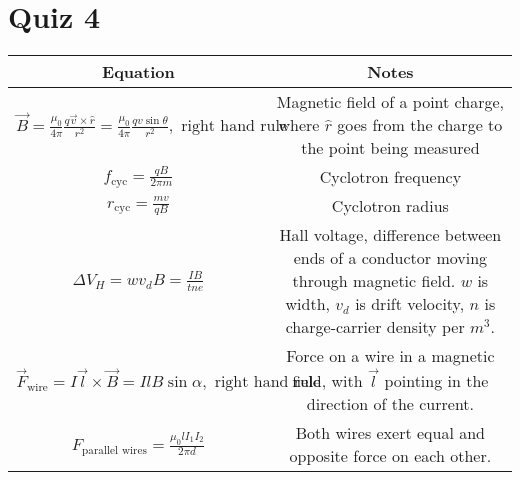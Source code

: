 \documentclass{article}
\begin{document}
\section{Quiz 4}

\begin{tabular}{|c|c|}
	\hline Equation                                             & Notes                                                    \\

	\hline $\vec B = \frac{\mu_0}{4 \pi} \frac{q \vec v \times \hat r}{r^2}
		= \frac{\mu_0}{4 \pi} \frac{q v \sin \theta }{r^2}, \text{ right hand rule}$
	                                                            & \makecell{Magnetic field of a point charge,              \\
	where $\hat r$ goes from the charge to the point being measured}                                                       \\

	$f_\text{cyc} = \frac{qB}{2 \pi m}$                         & Cyclotron frequency                                      \\

	$r_\text{cyc} = \frac{mv}{qB}$                              & Cyclotron radius                                         \\

	$\Delta V_H = w v_d B = \frac{IB}{tne}$                     &
	\makecell{Hall voltage, difference between ends of a conductor                                                         \\
	moving through magnetic field. $w$ is width, $v_d$ is drift velocity,                                                  \\
	$n$ is charge-carrier density per $m^3$.}                                                                              \\

	$\vec F_\text{wire} = I \vec l \times
	\vec B = IlB \sin \alpha, \text{ right hand rule}$          &
	\makecell{Force on a wire in a magnetic field, with $\vec l$                                                           \\
	pointing in the direction of the current.}                                                                             \\

	$F_\text{parallel wires} = \frac{\mu_0 l I_1 I_2}{2 \pi d}$ & Both wires exert equal and opposite force on each other. \\

	\hline
\end{tabular}
\end{document}
